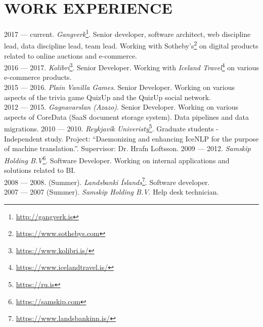 \section{WORK EXPERIENCE}
2017 --- current. \emph{Gangverk}\footnote{\url{http://gangverk.is}}. Senior developer, software architect, web discipline lead, data discipline lead, team lead. Working with Sotheby's\footnote{\url{https://www.sothebys.com}} on digital products related to online auctions and e-commerce.\\
2016 --- 2017. \emph{Kolibri}\footnote{\url{https://www.kolibri.is/}}. Senior Developer. Working with \emph{Iceland Travel}\footnote{\url{https://www.icelandtravel.is/}} on various e-commerce products.\\
2015 --- 2016. \emph{Plain Vanilla Games}. Senior Developer. Working on various aspects of the trivia game QuizUp and the QuizUp social network.\\
2012 --- 2015. \emph{Gagnavarslan (Azazo)}. Senior Developer. Working on various aspects of CoreData (SaaS document storage system). Data pipelines and data migrations.
2010 --- 2010. \emph{Reykjavík Univeristy}\footnote{\url{https://ru.is}}. Graduate students - Independent study. Project: ``Daemonizing and enhancing IceNLP for the purpose of machine translation.''. Supervisor: Dr. Hrafn Loftsson.
2009 --- 2012. \emph{Samskip Holding B.V}\footnote{\url{https://samskip.com}}. Software Developer. Working on internal applications and solutions related to BI.\\
2008 --- 2008. (Summer). \emph{Landsbanki Íslands}\footnote{\url{https://www.landsbankinn.is/}}. Software developer.\\
2007 --- 2007 (Summer). \emph{Samskip Holding B.V}. Help desk technician.

